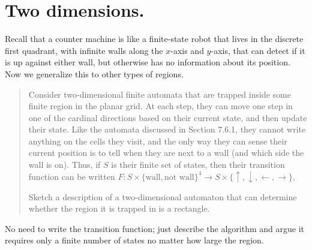 

\maketitle
\thispagestyle{firststyle}
\vspace{-2.0cm}


\section{Two dimensions.}
    Recall that a counter machine is like a finite-state robot that lives in the discrete first quadrant, with infinite walls along the $x$-axis and $y$-axis,
    that can detect if it is up against either wall, but otherwise has no information about its position.
    Now we generalize this to other types of regions.
    \begin{quote}
    Consider two-dimensional finite automata that are trapped inside some finite region in the planar grid.
    At each step, they can move one step in one of the cardinal directions based on their current state, and then update their state.
    Like the automata discussed in Section 7.6.1, they cannot write anything on the cells they visit, and the only way they can sense their current position is to tell when they are next to a wall
    (and which side the wall is on).
    Thus, if $S$ is their finite set of states,
    then their transition function can be written $F: S \times \{\text{wall}, \text{not wall} \}^4 \to S \times \{\uparrow, \downarrow, \leftarrow, \rightarrow\}$,


    Sketch a description of a two-dimensional automaton that can determine
    whether the region it is trapped in is a rectangle.
    \end{quote}
    No need to write the transition function;
    just describe the algorithm and argue it requires only a finite number of states no matter how large the region.

    

    
    
    

